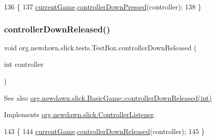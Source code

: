 \begin{DoxyCode}
136                                                       \{
137         \mbox{\hyperlink{classorg_1_1newdawn_1_1slick_1_1tests_1_1_test_box_a5e0fdb2f97173d828af597044c525078}{currentGame}}.\mbox{\hyperlink{classorg_1_1newdawn_1_1slick_1_1_basic_game_af4db3e5b864b3ee179de6935184727ac}{controllerDownPressed}}(controller);
138     \}
\end{DoxyCode}
\mbox{\label{classorg_1_1newdawn_1_1slick_1_1tests_1_1_test_box_af8a047e0bfc8291159b6bdd5b5158dc3}} 
\subsubsection{\texorpdfstring{controller\+Down\+Released()}{controllerDownReleased()}}
{\footnotesize\ttfamily void org.\+newdawn.\+slick.\+tests.\+Test\+Box.\+controller\+Down\+Released (\begin{DoxyParamCaption}\item[{int}]{controller }\end{DoxyParamCaption})\hspace{0.3cm}{\ttfamily [inline]}}

\begin{DoxySeeAlso}{See also}
\mbox{\hyperlink{classorg_1_1newdawn_1_1slick_1_1_basic_game_a8953e34950de681231d62cb8e7297263}{org.\+newdawn.\+slick.\+Basic\+Game\+::controller\+Down\+Released(int)}} 
\end{DoxySeeAlso}


Implements \mbox{\hyperlink{interfaceorg_1_1newdawn_1_1slick_1_1_controller_listener_a7d0ca99c8cd5b0d332bece1d17befee7}{org.\+newdawn.\+slick.\+Controller\+Listener}}.


\begin{DoxyCode}
143                                                        \{
144         \mbox{\hyperlink{classorg_1_1newdawn_1_1slick_1_1tests_1_1_test_box_a5e0fdb2f97173d828af597044c525078}{currentGame}}.\mbox{\hyperlink{classorg_1_1newdawn_1_1slick_1_1_basic_game_a8953e34950de681231d62cb8e7297263}{controllerDownReleased}}(controller);
145     \}
\end{DoxyCode}
\mbox{\label{classorg_1_1newdawn_1_1slick_1_1tests_1_1_test_box_a42966953b420faab6ab9261daf38ef13}} 
